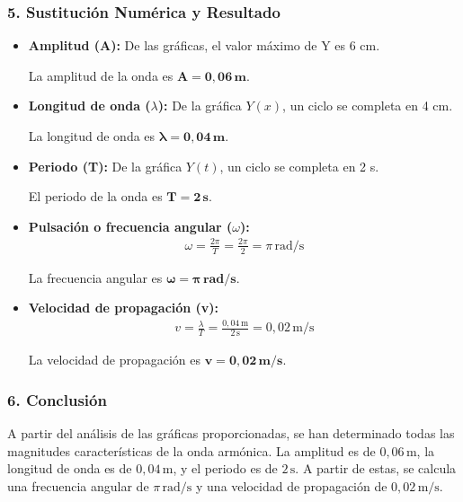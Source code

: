 \subsubsection*{5. Sustitución Numérica y Resultado}
\begin{itemize}
    \item \textbf{Amplitud (A):} De las gráficas, el valor máximo de Y es 6 cm.
    \begin{cajaresultado}
        La amplitud de la onda es $\boldsymbol{A = 0,06 \, \textbf{m}}$.
    \end{cajaresultado}
    \item \textbf{Longitud de onda ($\lambda$):} De la gráfica $Y(x)$, un ciclo se completa en 4 cm.
    \begin{cajaresultado}
        La longitud de onda es $\boldsymbol{\lambda = 0,04 \, \textbf{m}}$.
    \end{cajaresultado}
    \item \textbf{Periodo (T):} De la gráfica $Y(t)$, un ciclo se completa en 2 s.
    \begin{cajaresultado}
        El periodo de la onda es $\boldsymbol{T = 2 \, \textbf{s}}$.
    \end{cajaresultado}
    \item \textbf{Pulsación o frecuencia angular ($\omega$):}
    \begin{gather}
        \omega = \frac{2\pi}{T} = \frac{2\pi}{2} = \pi \, \text{rad/s}
    \end{gather}
    \begin{cajaresultado}
        La frecuencia angular es $\boldsymbol{\omega = \pi \, \textbf{rad/s}}$.
    \end{cajaresultado}
    \item \textbf{Velocidad de propagación (v):}
    \begin{gather}
        v = \frac{\lambda}{T} = \frac{0,04 \, \text{m}}{2 \, \text{s}} = 0,02 \, \text{m/s}
    \end{gather}
    \begin{cajaresultado}
        La velocidad de propagación es $\boldsymbol{v = 0,02 \, \textbf{m/s}}$.
    \end{cajaresultado}
\end{itemize}

\subsubsection*{6. Conclusión}
\begin{cajaconclusion}
A partir del análisis de las gráficas proporcionadas, se han determinado todas las magnitudes características de la onda armónica. La amplitud es de $0,06\,\text{m}$, la longitud de onda es de $0,04\,\text{m}$, y el periodo es de $2\,\text{s}$. A partir de estas, se calcula una frecuencia angular de $\pi\,\text{rad/s}$ y una velocidad de propagación de $0,02\,\text{m/s}$.
\end{cajaconclusion}
\newpage

